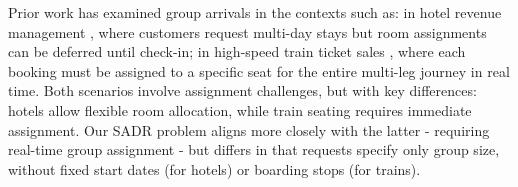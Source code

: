 Prior work has examined group arrivals in the contexts such as: in hotel revenue management \citep{bitran1995application, goldman2002models}, where customers request multi-day stays but room assignments can be deferred until check-in; in high-speed train ticket sales \citet{zhu2023assign}, where each booking must be assigned to a specific seat for the entire multi-leg journey in real time. Both scenarios involve assignment challenges, but with key differences: hotels allow flexible room allocation, while train seating requires immediate assignment. Our SADR problem aligns more closely with the latter - requiring real-time group assignment - but differs in that requests specify only group size, without fixed start dates (for hotels) or boarding stops (for trains).
 
 















